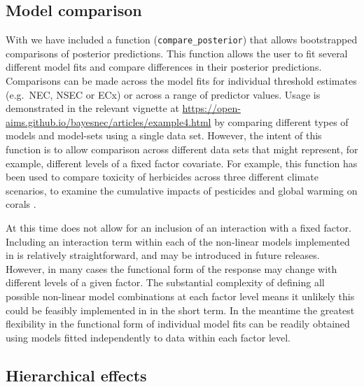 \documentclass[
  shortnames]{jss}
\begin{document}
\hypertarget{model-comparison}{%
\subsection{Model comparison}\label{model-comparison}}

With  we have included a function (\texttt{compare\_posterior}) that allows bootstrapped comparisons of posterior predictions. This function allows the user to fit several different  model fits and compare differences in their posterior predictions. Comparisons can be made across the model fits for individual threshold estimates (e.g.~NEC, NSEC or ECx) or across a range of predictor values. Usage is demonstrated in the relevant vignette at \url{https://open-aims.github.io/bayesnec/articles/example4.html} by comparing different types of models and model-sets using a single data set. However, the intent of this function is to allow comparison across different data sets that might represent, for example, different levels of a fixed factor covariate. For example, this function has been used to compare toxicity of herbicides across three different climate scenarios, to examine the cumulative impacts of pesticides and global warming on corals \citep{flores2021}.

At this time  does not allow for an inclusion of an interaction with a fixed factor. Including an interaction term within each of the non-linear models implemented in  is relatively straightforward, and may be introduced in future releases. However, in many cases the functional form of the response may change with different levels of a given factor. The substantial complexity of defining all possible non-linear model combinations at each factor level means it unlikely this could be feasibly implemented in  in the short term. In the meantime the greatest flexibility in the functional form of individual model fits can be readily obtained using models fitted independently to data within each factor level.

\hypertarget{hierarchical-effects}{%
\subsection{Hierarchical effects}\label{hierarchical-effects}}
\end{document}
